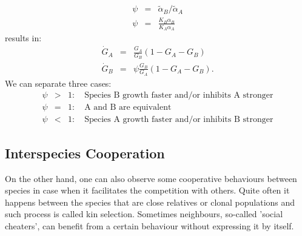 \documentclass[10pt,A4paper]{article}
\begin{document}
\begin{eqnarray}
\psi&=&\tilde{\alpha}_B/\tilde{\alpha}_A\\
\psi&=&\frac{K_B\alpha_B}{K_A\alpha_A}
\end{eqnarray}
results in: 
\begin{eqnarray}
\dot{G}_A &=&\frac{G_A}{G_B}\left(1 - G_A-G_B\right )\\
\dot{G}_B &=&\psi\frac{G_B}{G_A}\left(1-G_A-G_B\right ). 
\end{eqnarray}
We can separate three cases: 
\begin{eqnarray}
\psi&>&1:\quad\text{Species B growth faster and/or inhibits A stronger}\\
\psi&=&1:\quad\text{A and B are equivalent}\\
\psi&<&1:\quad\text{Species A growth faster and/or inhibits B stronger}
\end{eqnarray}

\subsection{Interspecies Cooperation}

On the other hand, one can also observe some cooperative behaviours between species in case when it facilitates the competition with others.
Quite often it happens between the species that are close relatives or clonal populations and such process is called kin selection. 
Sometimes neighbours, so-called 'social cheaters', can benefit from a certain behaviour without expressing it by itself.  
\end{document}
